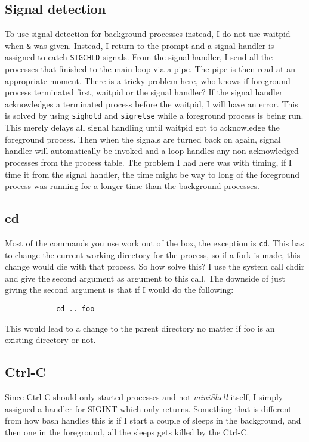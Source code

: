 \documentclass{article}
\begin{document}
    \subsection{Signal detection}
        To use signal detection for background processes instead, I do not use
        waitpid when \texttt{\&} was given. Instead, I return to the
        prompt and a signal handler is assigned to catch \texttt{SIGCHLD}
        signals. From the signal handler, I send all the processes that
        finished to the main loop via a pipe. The pipe is then read at an
        appropriate moment. There is a tricky problem here, who knows if foreground
        process terminated first, waitpid or the signal handler? If the signal handler
        acknowledges a terminated process before the waitpid, I will have an error.
        This is solved by using \texttt{sighold} and \texttt{sigrelse} while a
        foreground process is being run. This merely delays all signal handling until
        waitpid got to acknowledge the foreground process. Then when the signals
        are turned back on again, signal handler will automatically be invoked
        and a loop handles any non-acknowledged processes from the process table.
        The problem I had here was with timing, if I time it from the signal handler,
        the time might be way to long of the foreground process was running for a
        longer time than the background processes.
 
    \subsection{cd}
        Most of the commands you use work out of the box, the exception is
        \texttt{cd}. This has to change the current working directory for
        the process, so if a fork is made, this change would die with that
        process. So how solve this? I use the system call chdir and give
        the second argument as argument to this call. The downside of just
        giving the second argument is that if I would do the following:
        \begin{verbatim}
            cd .. foo
        \end{verbatim}
        This would lead to a change to the parent directory no matter if foo is
        an existing directory or not.

   \subsection{Ctrl-C}
        Since Ctrl-C should only started processes and not \emph{miniShell}
        itself, I simply assigned a handler for SIGINT which only returns.
        Something that is different from how bash handles this is if I start
        a couple of sleeps in the background, and then one in the foreground,
        all the sleeps gets killed by the Ctrl-C.
\end{document}
